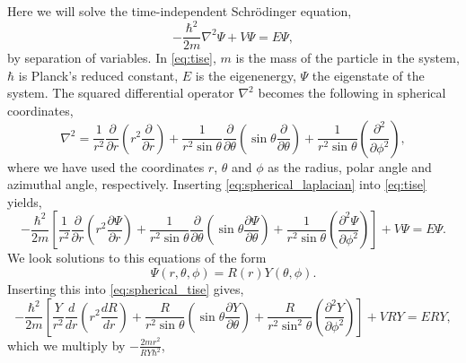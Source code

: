 Here we will solve the time-independent Schrödinger equation,
\begin{equation}
    \label{eq:tise}
    -\frac{\hbar^2}{2m}\nabla^2\Psi + V\Psi = E\Psi,
\end{equation}
by separation of variables. In \autoref{eq:tise}, $m$ is the mass of the 
particle in the system, $\hbar$ is Planck's reduced constant, $E$ is the eigenenergy,
$\Psi$ the eigenstate of the system. The squared differential operator $\nabla^2$
becomes the following in spherical coordinates,
\begin{equation}
    \label{eq:spherical_laplacian}
    \nabla^2 = 
        \frac{1}{r^2} \frac{\partial}{\partial r} 
            \left(r^2 \frac{\partial}{\partial r}\right)
        + 
        \frac{1}{r^2\sin\theta} \frac{\partial}{\partial \theta}
            \left(\sin\theta \frac{\partial}{\partial \theta} \right)
        +
        \frac{1}{r^2\sin\theta}
            \left(\frac{\partial^2}{\partial\phi^2}\right),
\end{equation}
where we have used the coordinates $r$, $\theta$ and $\phi$ as the radius,
polar angle and azimuthal angle, respectively. Inserting
\autoref{eq:spherical_laplacian} into \autoref{eq:tise} yields,
\begin{equation}
    \label{eq:spherical_tise}
    -\frac{\hbar^2}{2m}
    \left[
        \frac{1}{r^2}\frac{\partial}{\partial r} 
            \left(r^2 \frac{\partial \Psi}{\partial r} \right)
        +
        \frac{1}{r^2\sin\theta} \frac{\partial}{\partial\theta}
            \left(\sin\theta \frac{\partial \Psi}{\partial \theta} \right)
        +
        \frac{1}{r^2\sin\theta}
            \left(\frac{\partial^2 \Psi}{\partial \phi^2} \right)
    \right]
    +
    V \Psi
    =
    E \Psi.
\end{equation}
We look solutions to this equations of the form 
\begin{equation}
    \Psi(r,\theta,\phi) = R(r) Y(\theta, \phi).
\end{equation}
Inserting this into \autoref{eq:spherical_tise} gives,
\begin{equation}
   -\frac{\hbar^2}{2m}
   \left[
        \frac{Y}{r^2} \frac{d}{dr}
            \left(r^2\frac{dR}{dr} \right)
        +
        \frac{R}{r^2\sin\theta}
            \left(\sin\theta \frac{\partial Y}{\partial\theta} \right)
        +
        \frac{R}{r^2\sin^2\theta}
            \left(\frac{\partial^2Y}{\partial\phi^2} \right)
   \right] 
    +
    VRY
    =
    ERY,
\end{equation}
which we multiply by $-\frac{2mr^2}{RY\hbar^2}$,
